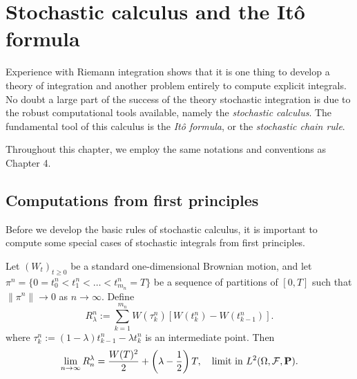 \section{Stochastic calculus and the It\^{o} formula}
Experience with Riemann integration shows that it is one thing to develop a theory of integration and another problem entirely to compute explicit integrals. No doubt a large part of the success of the theory stochastic integration is due to the robust computational tools available, namely the \emph{stochastic calculus}. The fundamental tool of this calculus is the \emph{It\^{o} formula}, or the \emph{stochastic chain rule}.

Throughout this chapter, we employ the same notations and conventions as Chapter 4.

\subsection{Computations from first principles}
Before we develop the basic rules of stochastic calculus, it is important to compute some special cases of stochastic integrals from first principles.

\begin{lemma}
\label{lem:WdW}
Let $(W_t)_{t\ge 0}$ be a standard one-dimensional Brownian motion, and let $\pi^n=\{0=t_0^n<t_1^n<\ldots <t_{m_n}^n=T\}$ be a sequence of partitions of $[0,T]$ such that $\|\pi^n\|\to 0$ as $n\to\infty$. Define
\begin{equation*}
    R_\lambda^n := \sum_{k=1}^{m_n} W(\tau^n_k)[W(t_k^n)-W(t_{k-1}^n)].
\end{equation*}
where $\tau_k^n := (1-\lambda)t_{k-1}^n - \lambda t_k^n$ is an intermediate point. Then
\begin{equation}
    \lim_{n\to\infty} R_n^\lambda = \frac{W(T)^2}{2} + \left(\lambda-\frac{1}{2}\right)T, \quad\text{limit in } L^2(\Omega,\mathcal{F},\mathbf{P}).
\end{equation}
\end{lemma}

